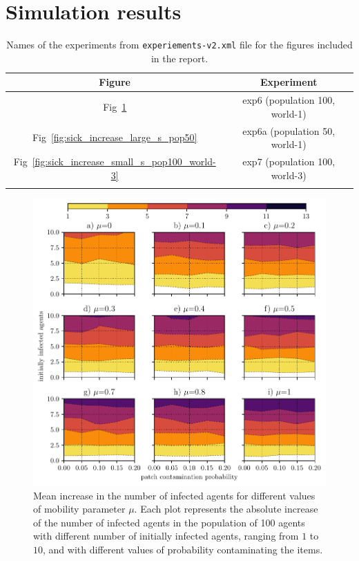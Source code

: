 \documentclass[11pt,a4paper]{article}
\begin{document}
\section{Simulation results}

\begin{table}[ht!]
\centering
\begin{tabular}{|c|c|}
\hline
\textbf{Figure} & \textbf{Experiment} \\
\hline
Fig~\ref{fig:sick_increase_large_s_pop100} & exp6  (population 100, world-1)\\
\hline
Fig~\ref{fig:sick_increase_large_s_pop50} & exp6a (population 50, world-1)\\ 
\hline
Fig~\ref{fig:sick_increase_small_s_pop100_world-3} & exp7 (population 100, world-3)  \\
\hline
 &  \\
\hline
\end{tabular}
\caption{Names of the experiments from \texttt{experiements-v2.xml} file for the figures included in the report.}
\end{table}


\begin{figure}[ht!]
\includegraphics{plots/sick_increase_large_s_pop100.pdf}
\caption{Mean increase in the number of infected agents for different values of mobility parameter $\mu$. Each plot represents the absolute increase of the number of infected agents in the population of 100 agents with different number of initially infected agents, ranging from $1$ to $10$,  and with different values of probability contaminating the items.}
\label{fig:sick_increase_large_s_pop100}
\end{figure}
\end{document}
